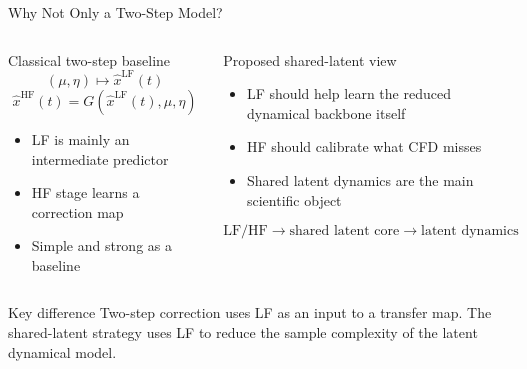 \documentclass[aspectratio=169]{beamer}
\begin{document}
\begin{frame}{Why Not Only a Two-Step Model?}
\small
\begin{columns}[T]
\begin{block}{Classical two-step baseline}
\[
(\mu,\eta) \mapsto \widehat x^{\mathrm{LF}}(t)
\]
\[
\widehat x^{\mathrm{HF}}(t) = G(\widehat x^{\mathrm{LF}}(t),\mu,\eta)
\]
\begin{itemize}
\item LF is mainly an intermediate predictor
\item HF stage learns a correction map
\item Simple and strong as a baseline
\end{itemize}
\end{block}

\begin{block}{Proposed shared-latent view}
\begin{itemize}
\item LF should help learn the reduced dynamical backbone itself
\item HF should calibrate what CFD misses
\item Shared latent dynamics are the main scientific object
\end{itemize}
\[
\text{LF/HF} \rightarrow \text{shared latent core} \rightarrow \text{latent dynamics}
\]
\end{block}
\end{columns}

\vspace{0.4em}
\begin{alertblock}{Key difference}
Two-step correction uses LF as an input to a transfer map. The shared-latent strategy uses LF to reduce the sample complexity of the latent dynamical model.
\end{alertblock}
\end{frame}
\end{document}
